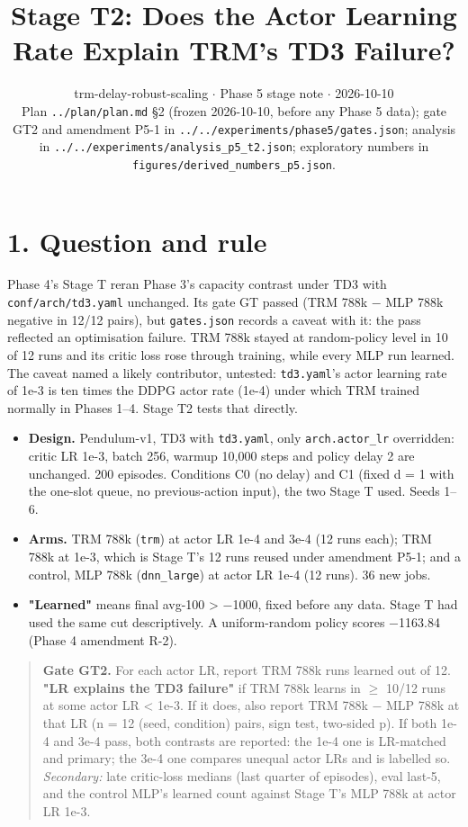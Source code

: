 \documentclass[11pt]{article}
\title{Stage T2: Does the Actor Learning Rate Explain TRM's TD3 Failure?}
\author{}
\date{trm-delay-robust-scaling $\cdot$ Phase 5 stage note $\cdot$ 2026-10-10\\[2pt]Plan \texttt{.\allowbreak{}.\allowbreak{}/\allowbreak{}plan/\allowbreak{}plan.\allowbreak{}md} \S{}2 (frozen 2026-10-10, before any Phase 5 data); gate GT2 and amendment P5-1 in \texttt{.\allowbreak{}.\allowbreak{}/\allowbreak{}.\allowbreak{}.\allowbreak{}/\allowbreak{}experiments/\allowbreak{}phase5/\allowbreak{}gates.\allowbreak{}json}; analysis in \texttt{.\allowbreak{}.\allowbreak{}/\allowbreak{}.\allowbreak{}.\allowbreak{}/\allowbreak{}experiments/\allowbreak{}analysis\_\allowbreak{}p5\_\allowbreak{}t2.\allowbreak{}json}; exploratory numbers in \texttt{figures/\allowbreak{}derived\_\allowbreak{}numbers\_\allowbreak{}p5.\allowbreak{}json}.}
\begin{document}
\maketitle
\section*{1. Question and rule}



Phase 4's Stage T reran Phase 3's capacity contrast under TD3 with \texttt{conf/\allowbreak{}arch/\allowbreak{}td3.\allowbreak{}yaml} unchanged. Its gate GT passed (TRM 788k $-$ MLP 788k negative in 12/12 pairs), but \texttt{gates.json} records a caveat with it: the pass reflected an optimisation failure. TRM 788k stayed at random-policy level in 10 of 12 runs and its critic loss rose through training, while every MLP run learned. The caveat named a likely contributor, untested: \texttt{td3.yaml}'s actor learning rate of 1e-3 is ten times the DDPG actor rate (1e-4) under which TRM trained normally in Phases 1--4. Stage T2 tests that directly.



\begin{itemize}
\item \textbf{Design.} Pendulum-v1, TD3 with \texttt{td3.yaml}, only \texttt{arch.actor\_lr} overridden: critic LR 1e-3, batch 256, warmup 10,000 steps and policy delay 2 are unchanged. 200 episodes. Conditions C0 (no delay) and C1 (fixed d = 1 with the one-slot queue, no previous-action input), the two Stage T used. Seeds 1--6.
\item \textbf{Arms.} TRM 788k (\texttt{trm}) at actor LR 1e-4 and 3e-4 (12 runs each); TRM 788k at 1e-3, which is Stage T's 12 runs reused under amendment P5-1; and a control, MLP 788k (\texttt{dnn\_large}) at actor LR 1e-4 (12 runs). 36 new jobs.
\item \textbf{"Learned"} means final avg-100 > $-$1000, fixed before any data. Stage T had used the same cut descriptively. A uniform-random policy scores $-$1163.84 (Phase 4 amendment R-2).
\end{itemize}



\begin{quote}\textbf{Gate GT2.} For each actor LR, report TRM 788k runs learned out of 12. \textbf{"LR explains the TD3 failure"} if TRM 788k learns in $\geq$ 10/12 runs at some actor LR < 1e-3. If it does, also report TRM 788k $-$ MLP 788k at that LR (n = 12 (seed, condition) pairs, sign test, two-sided p). If both 1e-4 and 3e-4 pass, both contrasts are reported: the 1e-4 one is LR-matched and primary; the 3e-4 one compares unequal actor LRs and is labelled so. \emph{Secondary:} late critic-loss medians (last quarter of episodes), eval last-5, and the control MLP's learned count against Stage T's MLP 788k at actor LR 1e-3.\end{quote}
\end{document}
